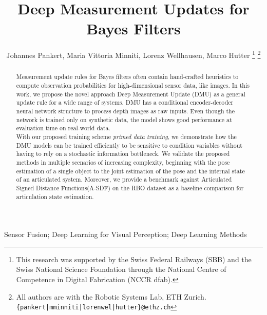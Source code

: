 \documentclass[letterpaper, 10 pt, journal, twoside]{ieeetran}  %
\title{Deep Measurement Updates for Bayes Filters}
\author{Johannes Pankert, Maria Vittoria Minniti, Lorenz Wellhausen, Marco Hutter %
\thanks{This research was supported by the Swiss Federal Railways (SBB) and the Swiss National Science Foundation through the National Centre of Competence in Digital Fabrication (NCCR dfab).}
\thanks{All authors are with the Robotic Systems Lab, ETH Zurich. {\tt\small \{pankert|mminniti|lorenwel|hutter\}@ethz.ch}
}%
}
\begin{document}
\setlength{\dbltextfloatsep}{15pt}



\maketitle


\begin{abstract}
Measurement update rules for Bayes filters often contain hand-crafted heuristics to compute observation probabilities for high-dimensional sensor data, like images.
In this work, we propose the novel approach Deep Measurement Update (DMU) as a general update rule for a wide range of systems.
DMU has a conditional encoder-decoder neural network structure to process depth images as raw inputs. Even though the network is trained only on synthetic data, the model shows good performance at evaluation time on real-world data.\\
With our proposed training scheme \textit{primed data training}, we demonstrate how the DMU models can be trained efficiently to be sensitive to condition variables without having to rely on a stochastic information bottleneck.
We validate the proposed methods in multiple scenarios of increasing complexity, beginning with the pose estimation of a single object to the joint estimation of the pose and the internal state of an articulated system.
Moreover, we provide a benchmark against Articulated Signed Distance Functions(A-SDF) on the RBO dataset as a baseline comparison for articulation state estimation.
\end{abstract}
\begin{IEEEkeywords}
Sensor Fusion; Deep Learning for Visual Perception; Deep Learning Methods
\end{IEEEkeywords}
\end{document}
